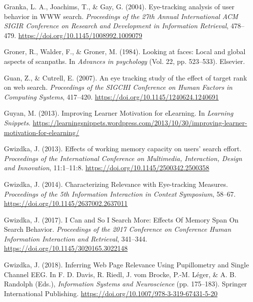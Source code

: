 \documentclass[letterpaper, nobind]{templates/ociamthesis}
\newlength{\cslhangindent}
\newenvironment{CSLReferences}[2] %
 {%
  \setlength{\parindent}{0pt}
  \ifodd #1
  \let\oldpar\par
  \def\par{\hangindent=\cslhangindent\oldpar}
  \fi
  \setlength{\parskip}{1mm}
  \setlength{\baselineskip}{6mm}
 }%
 {}
\begin{document}
\begin{CSLReferences}{1}{0}
\leavevmode{}%
Granka, L. A., Joachims, T., \& Gay, G. (2004). Eye-tracking analysis of user behavior in {WWW} search. \emph{Proceedings of the 27th Annual International {ACM SIGIR} Conference on Research and Development in Information Retrieval}, 478--479. \url{https://doi.org/10.1145/1008992.1009079}

\leavevmode{}%
Groner, R., Walder, F., \& Groner, M. (1984). Looking at faces: Local and global aspects of scanpaths. In \emph{Advances in psychology} (Vol. 22, pp. 523--533). Elsevier.

\leavevmode{}%
Guan, Z., \& Cutrell, E. (2007). An eye tracking study of the effect of target rank on web search. \emph{Proceedings of the {SIGCHI} Conference on Human Factors in Computing Systems}, 417--420. \url{https://doi.org/10.1145/1240624.1240691}

\leavevmode{}%
Guyan, M. (2013). Improving {Learner Motivation} for {eLearning}. In \emph{Learning Snippets}. \url{https://learningsnippets.wordpress.com/2013/10/30/improving-learner-motivation-for-elearning/}

\leavevmode{}%
Gwizdka, J. (2013). Effects of working memory capacity on users' search effort. \emph{Proceedings of the {International Conference} on {Multimedia}, {Interaction}, {Design} and {Innovation}}, 11:1--11:8. \url{https://doi.org/10.1145/2500342.2500358}

\leavevmode{}%
Gwizdka, J. (2014). Characterizing {Relevance} with {Eye}-tracking {Measures}. \emph{Proceedings of the 5th {Information Interaction} in {Context Symposium}}, 58--67. \url{https://doi.org/10.1145/2637002.2637011}

\leavevmode{}%
Gwizdka, J. (2017). I {Can} and {So I Search More}: Effects {Of Memory Span On Search Behavior}. \emph{Proceedings of the 2017 {Conference} on {Conference Human Information Interaction} and {Retrieval}}, 341--344. \url{https://doi.org/10.1145/3020165.3022148}

\leavevmode{}%
Gwizdka, J. (2018). Inferring {Web Page Relevance Using Pupillometry} and {Single Channel EEG}. In F. D. Davis, R. Riedl, J. vom Brocke, P.-M. Léger, \& A. B. Randolph (Eds.), \emph{Information {Systems} and {Neuroscience}} (pp. 175--183). {Springer International Publishing}. \url{https://doi.org/10.1007/978-3-319-67431-5-20}


\end{CSLReferences}
\end{document}
